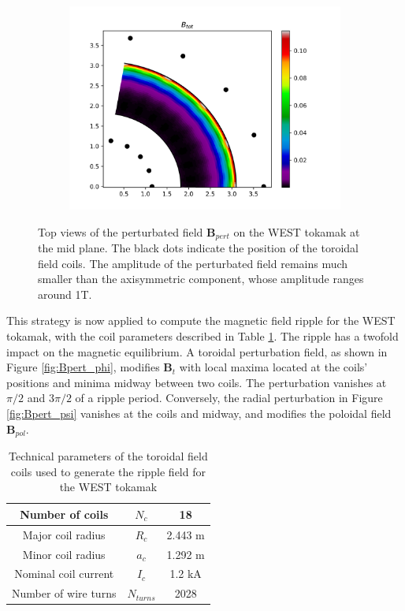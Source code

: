 \begin{figure}[H]
\begin{subfigure}[t]{0.3\textwidth}
		\includegraphics[width=1\textwidth]{schemes/rippleBtot.png}
	\end{subfigure}
	\caption{Top views of the perturbated field $\textbf{B}_{pert}$ on the WEST tokamak at the mid plane. The black dots indicate the position of the toroidal field coils. The  amplitude of the perturbated field remains much smaller than the axisymmetric component, whose amplitude ranges around 1T.}
	\label{fig:Bpert_fields}
\end{figure}

This strategy is now applied to compute the magnetic field ripple for the WEST tokamak, with the coil parameters described in Table \ref{tab:coilParameters}. The ripple has a twofold impact on the magnetic equilibrium. A toroidal perturbation field, as shown in Figure \ref{fig:Bpert_phi}, modifies $\textbf{B}_t$ with local maxima located at the coils' positions and minima midway between two coils. The perturbation vanishes at $\pi/2$ and $3\pi/2$ of a ripple period. Conversely, the radial perturbation in Figure \ref{fig:Bpert_psi} vanishes at the coils and midway, and modifies the poloidal field $\textbf{B}_{pol}$.

\begin{table}[H]
	\centering
	\begin{tabular}{|c||c|c|}
		\hline
		Number of coils & $N_c$ & 18 \\
		\hline
		Major coil radius & $R_c$ & 2.443 m\\
		\hline
		Minor coil radius & $a_c$ & 1.292 m\\
		\hline
		Nominal coil current & $I_c$ & 1.2 kA \\
		\hline
		Number of wire turns & $N_{turns}$ & 2028 \\
		\hline        
	\end{tabular}
	\caption{Technical parameters of the toroidal field coils used to generate the ripple field for the WEST tokamak}
	\label{tab:coilParameters}
\end{table}

